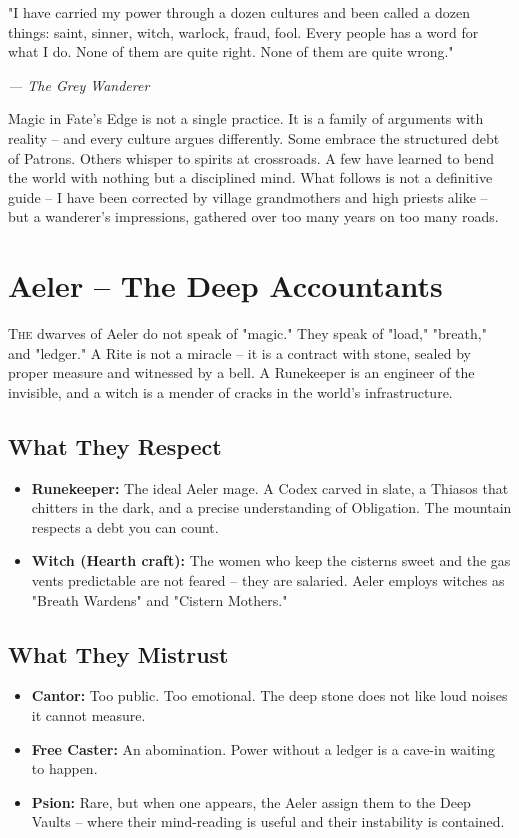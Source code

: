 \documentclass[10pt,a5paper]{book}
\begin{document}
\epigraph{"I have carried my power through a dozen cultures and been called a dozen things: saint, sinner, witch, warlock, fraud, fool. Every people has a word for what I do. None of them are quite right. None of them are quite wrong."}{\textit{--- The Grey Wanderer}}

Magic in Fate's Edge is not a single practice. It is a family of arguments with reality -- and every culture argues differently. Some embrace the structured debt of Patrons. Others whisper to spirits at crossroads. A few have learned to bend the world with nothing but a disciplined mind. What follows is not a definitive guide -- I have been corrected by village grandmothers and high priests alike -- but a wanderer's impressions, gathered over too many years on too many roads.

\section{Aeler -- The Deep Accountants}

\lettrine{T}{he} dwarves of Aeler do not speak of "magic." They speak of "load," "breath," and "ledger." A Rite is not a miracle -- it is a contract with stone, sealed by proper measure and witnessed by a bell. A Runekeeper is an engineer of the invisible, and a witch is a mender of cracks in the world's infrastructure.

\subsection*{What They Respect}
\begin{itemize}
    \item \textbf{Runekeeper:} The ideal Aeler mage. A Codex carved in slate, a Thiasos that chitters in the dark, and a precise understanding of Obligation. The mountain respects a debt you can count.
    \item \textbf{Witch (Hearth craft):} The women who keep the cisterns sweet and the gas vents predictable are not feared -- they are salaried. Aeler employs witches as "Breath Wardens" and "Cistern Mothers."
\end{itemize}

\subsection*{What They Mistrust}
\begin{itemize}
    \item \textbf{Cantor:} Too public. Too emotional. The deep stone does not like loud noises it cannot measure.
    \item \textbf{Free Caster:} An abomination. Power without a ledger is a cave-in waiting to happen.
    \item \textbf{Psion:} Rare, but when one appears, the Aeler assign them to the Deep Vaults -- where their mind-reading is useful and their instability is contained.
\end{itemize}
\end{document}

